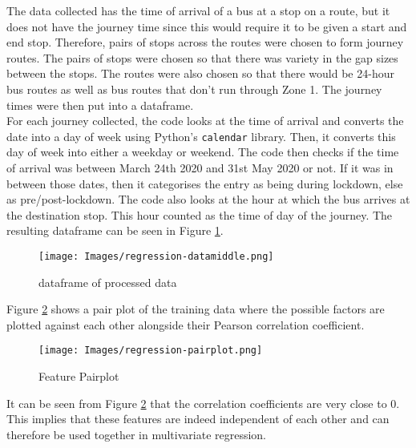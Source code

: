 The data collected has the time of arrival of a bus at a stop on a route, but it does not have the journey time since this would require it to be given a start and end stop. Therefore, pairs of stops across the routes were chosen to form journey routes. The pairs of stops were chosen so that there was variety in the gap sizes between the stops. The routes were also chosen so that there would be 24-hour bus routes as well as bus routes that don't run through Zone 1. The journey times were then put into a dataframe. \\

For each journey collected, the code looks at the time of arrival and converts the date into a day of week using Python's \texttt{calendar} library. Then, it converts this day of week into either a weekday or weekend. The code then checks if the time of arrival was between March 24th 2020 and 31st May 2020 or not. If it was in between those dates, then it categorises the entry as being during lockdown, else as pre/post-lockdown. The code also looks at the hour at which the bus arrives at the destination stop. This hour counted as the time of day of the journey. The resulting dataframe can be seen in Figure \ref{fig:regression-datamiddle}.

\begin{figure}[H]
\begin{center}
    \texttt{[image: Images/regression-datamiddle.png]}
    \caption{dataframe of processed data}
    \label{fig:regression-datamiddle}
\end{center}
\end{figure}

Figure \ref{fig:regression-pairplot} shows a pair plot of the training data where the possible factors are plotted against each other alongside their Pearson correlation coefficient.

\begin{figure}[H]
\begin{center}
    \texttt{[image: Images/regression-pairplot.png]}
    \caption{Feature Pairplot}
    \label{fig:regression-pairplot}
\end{center}
\end{figure}

It can be seen from Figure \ref{fig:regression-pairplot} that the correlation coefficients are very close to 0. This implies that these features are indeed independent of each other and can therefore be used together in multivariate regression. \\

